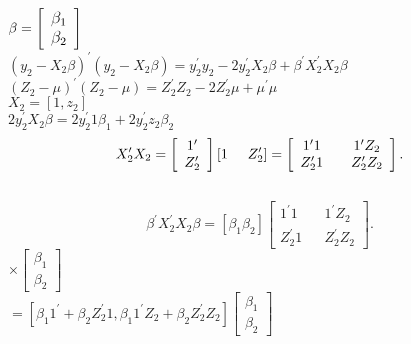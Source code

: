 \documentclass{article}\usepackage[]{graphicx}\usepackage[]{color}
\begin{document}
$\large{\beta}=\left[\begin{array}{c} \beta_{1} \\ \beta_{2} \end{array} \right]$
\vspace{5mm}\\


$(y_{2}-X_{2}\beta)^{\prime}(y_{2}-X_{2}\beta)=y_{2}^{\prime}y_{2}-2y_{2}^{\prime}X_{2}\beta+\beta^{\prime}X_{2}^{\prime}X_{2}\beta$\\

$(Z_{2}-\mu)^{\prime}(Z_{2}-\mu)=Z_{2}^{\prime}Z_{2}-2Z_{2}^{\prime}\mu+\mu^{\prime}\mu$
\vspace{5mm}\\
$X_{2}=[1,z_{2}]$
\vspace{5mm}\\
$2y_{2}^{\prime}X_{2}\beta=2y_{2}^{\prime}1\beta_{1}+2y_{2}^{\prime}z_{2}\beta_{2}$
\vspace{5mm}\\
\[X_{2}^{\prime}X_{2} =\left[ \begin{array}{c} 1^{\prime} \\ Z_{2}^{\prime} \end{array} \right]\left[1 \hspace{5mm} Z_{2}^{\prime}\right]= \left[ \begin{array}{cccc}
1^{\prime}1& & 1^{\prime}Z_{2}\\
 Z_{2}^{\prime}1 & & Z_{2}^{\prime}Z_{2} \end{array} \right] .\]\\
 

 \[\beta^{\prime}X_{2}^{\prime}X_{2}\beta = \left[\beta_{1} \beta_{2}\right]\left[ \begin{array}{cccc}
1^{\prime}1& & 1^{\prime}Z_{2}\\
 Z_{2}^{\prime}1 & & Z_{2}^{\prime}Z_{2} \end{array} \right] .\] $\times \left[ \begin{array}{c} \beta_{1} \\ \beta_{2} \end{array} \right]$\\
 
 $=\left[\beta_{1}1^{\prime}+\beta_{2}Z_{2}^{\prime}1,\beta_{1}1^{\prime}Z_{2}+\beta_{2} Z_{2}^{\prime}Z_{2}\right]\left[ \begin{array}{c} \beta_{1} \\ \beta_{2} \end{array} \right]$\\
\end{document}
